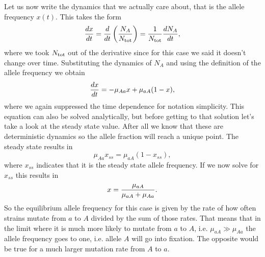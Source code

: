 Let us now write the dynamics that we actually care about, that is the allele
frequency $x(t)$. This takes the form
\begin{equation}
  {d{x} \over dt} = {d{} \over dt}\left( {N_A \over N_{\text{tot}}} \right) = {1 \over N_{\text{tot}}} {d{N_A} \over dt},
\end{equation}
where we took $N_{\text{tot}}$ out of the derivative since for this case we said it
doesn't change over time. Substituting the dynamics of $N_A$ and using the
definition of the allele frequency we obtain
\begin{equation}
  {d{x} \over dt} = - \mu_{A a} x + \mu_{a A} (1 - x),
  \label{eq_mutation_ode}
\end{equation}
where we again suppressed the time dependence for notation simplicity. This
equation can also be solved analytically, but before getting to that solution
let's take a look at the steady state value. After all we know that these are
deterministic dynamics so the allele fraction will reach a unique point. The
steady state results in
\begin{equation}
  \mu_{A a} x_{ss} = \mu_{a A} (1 - x_{ss}),
\end{equation}
where $x_{ss}$ indicates that it is the steady state allele frequency. If we
now solve for $x_{ss}$ this results in
\begin{equation}
  x = {\mu_{a A} \over \mu_{a A} + \mu_{A a}}.
\end{equation}
So the equilibrium allele frequency for this case is given by the rate of how
often strains mutate from $a$ to $A$ divided by the sum of those rates. That
means that in the limit where it is much more likely to mutate from $a$ to $A$,
i.e. $\mu_{a A} \gg \mu_{A a}$ the allele frequency goes
to one, i.e. allele $A$ will go into fixation. The opposite would be true for a
much larger mutation rate from $A$ to $a$.

